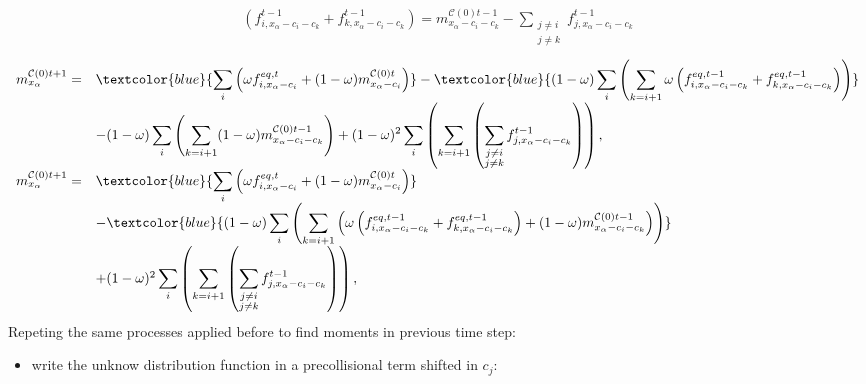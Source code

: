 \documentclass[letterpaper,10pt,english,openany,oneside]{jupyterBook}
\begin{document}
\begin{equation*}
\begin{split}
\boxed{ \left(f_{i,x_{\alpha}-c_{i}-c_{k}}^{t-1}  + f_{k,x_{\alpha}-c_{i}-c_{k}}^{t-1} \right) = m_{x_{\alpha}-c_{i}-c_{k}}^{\mathcal{C}(0)t-1} - \sum_{\substack{j\ne i\\j\ne k}} f_{j,x_{\alpha}-c_{i}-c_{k}}^{t-1}  }
\end{split}
\end{equation*}\begin{equation*}
\begin{split}
\begin{array}{rl}
m_{x_{\alpha}}^{\mathcal{C}(0)t+1} = & \textcolor{blue}{\displaystyle\sum_{i}\left(\omega f_{i,x_{\alpha}-c_{i}}^{eq,t} + (1-\omega)m_{x_{\alpha}-c_{i}}^{\mathcal{C}(0)t} \right)} - \textcolor{blue}{(1-\omega) \displaystyle\sum_{i}\left( \sum_{k= i+1} \omega \left(f_{i,x_{\alpha}-c_{i}-c_{k}}^{eq,t-1} + f_{k,x_{\alpha}-c_{i}-c_{k}}^{eq,t-1} \right) \right)} \\
&- (1-\omega) \displaystyle\sum_{i}\left( \sum_{k= i+1}  (1-\omega)m_{x_{\alpha}-c_{i}-c_{k}}^{\mathcal{C}(0)t-1}  \right) + (1-\omega)^{2} \displaystyle\sum_{i}\left( \sum_{k= i+1} \left( \sum_{\substack{j\ne i\\j\ne k}} f_{j,x_{\alpha}-c_{i}-c_{k}}^{t-1} \right) \right), \\
m_{x_{\alpha}}^{\mathcal{C}(0)t+1} = & \textcolor{blue}{\displaystyle\sum_{i}\left(\omega f_{i,x_{\alpha}-c_{i}}^{eq,t} + (1-\omega)m_{x_{\alpha}-c_{i}}^{\mathcal{C}(0)t} \right)} \\
&- \textcolor{blue}{(1-\omega) \displaystyle\sum_{i}\left( \sum_{k= i+1} \left( \omega \left(f_{i,x_{\alpha}-c_{i}-c_{k}}^{eq,t-1} + f_{k,x_{\alpha}-c_{i}-c_{k}}^{eq,t-1} \right)  + (1-\omega)m_{x_{\alpha}-c_{i}-c_{k}}^{\mathcal{C}(0)t-1} \right) \right)} \\
&+ (1-\omega)^{2} \displaystyle\sum_{i}\left( \sum_{k= i+1} \left( \sum_{\substack{j\ne i\\j\ne k}} f_{j,x_{\alpha}-c_{i}-c_{k}}^{t-1} \right) \right),
\end{array}
\end{split}
\end{equation*}
\sphinxAtStartPar
Repeting the same processes applied before to find moments in previous time step:
\begin{itemize}
\item {} 
\sphinxAtStartPar
write the unknow distribution function in a pre\sphinxhyphen{}collisional term shifted in \(c_{j}\):

\end{itemize}
\end{document}
